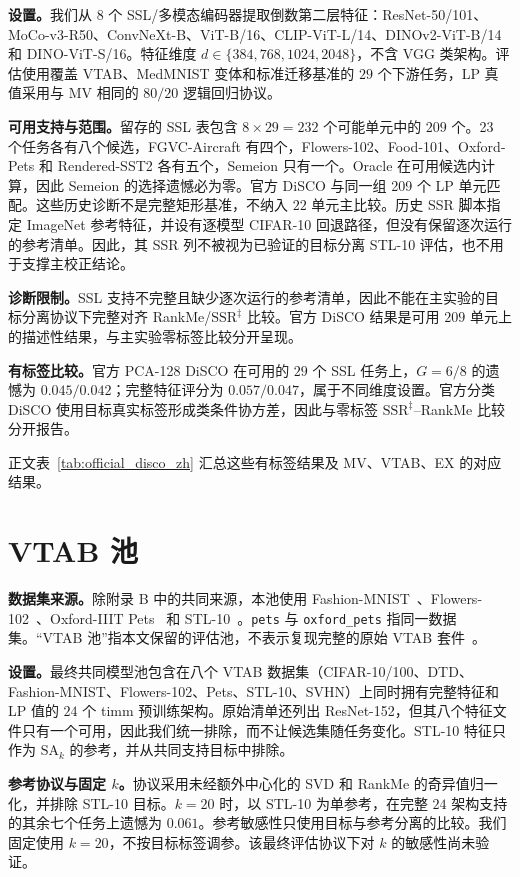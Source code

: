 \documentclass{article}
\newcommand{\SAk}{\ensuremath{\mathrm{SA}_k}\xspace}
\newcommand{\SSRdag}{\ensuremath{\mathrm{SSR}^{\ddagger}}\xspace}
\begin{document}
\textbf{设置。}我们从 $8$ 个 SSL/多模态编码器提取倒数第二层特征：ResNet-50/101、MoCo-v3-R50、ConvNeXt-B、ViT-B/16、CLIP-ViT-L/14、DINOv2-ViT-B/14 和 DINO-ViT-S/16。特征维度 $d\in\{384,768,1024,2048\}$，不含 VGG 类架构。评估使用覆盖 VTAB、MedMNIST 变体和标准迁移基准的 $29$ 个下游任务，LP 真值采用与 MV 相同的 $80/20$ 逻辑回归协议。

\textbf{可用支持与范围。}留存的 SSL 表包含 $8\times29=232$ 个可能单元中的 $209$ 个。23 个任务各有八个候选，FGVC-Aircraft 有四个，Flowers-102、Food-101、Oxford-Pets 和 Rendered-SST2 各有五个，Semeion 只有一个。Oracle 在可用候选内计算，因此 Semeion 的选择遗憾必为零。官方 DiSCO 与同一组 209 个 LP 单元匹配。这些历史诊断不是完整矩形基准，不纳入 $22$ 单元主比较。历史 SSR 脚本指定 ImageNet 参考特征，并设有逐模型 CIFAR-10 回退路径，但没有保留逐次运行的参考清单。因此，其 SSR 列不被视为已验证的目标分离 STL-10 评估，也不用于支撑主校正结论。

\textbf{诊断限制。}SSL 支持不完整且缺少逐次运行的参考清单，因此不能在主实验的目标分离协议下完整对齐 RankMe/\SSRdag 比较。官方 DiSCO 结果是可用 $209$ 单元上的描述性结果，与主实验零标签比较分开呈现。

\textbf{有标签比较。}官方 PCA-128 DiSCO 在可用的 $29$ 个 SSL 任务上，$G=6/8$ 的遗憾为 $0.045/0.042$；完整特征评分为 $0.057/0.047$，属于不同维度设置。官方分类 DiSCO 使用目标真实标签形成类条件协方差，因此与零标签 \SSRdag--RankMe 比较分开报告。

正文表~\ref{tab:official_disco_zh} 汇总这些有标签结果及 MV、VTAB、EX 的对应结果。

\section{VTAB 池}
\textbf{数据集来源。}除附录 B 中的共同来源，本池使用 Fashion-MNIST~\citep{xiao2017fashion}、Flowers-102~\citep{nilsback2008flowers}、Oxford-IIIT Pets~\citep{parkhi2012pets} 和 STL-10~\citep{coates2011stl10}。\texttt{pets} 与 \texttt{oxford\_pets} 指同一数据集。“VTAB 池”指本文保留的评估池，不表示复现完整的原始 VTAB 套件~\citep{zhai2019large}。

\textbf{设置。}最终共同模型池包含在八个 VTAB 数据集（CIFAR-10/100、DTD、Fashion-MNIST、Flowers-102、Pets、STL-10、SVHN）上同时拥有完整特征和 LP 值的 $24$ 个 timm 预训练架构。原始清单还列出 ResNet-152，但其八个特征文件只有一个可用，因此我们统一排除，而不让候选集随任务变化。STL-10 特征只作为 $\SAk$ 的参考，并从共同支持目标中排除。

\textbf{参考协议与固定 $k$。}协议采用未经额外中心化的 SVD 和 RankMe 的奇异值归一化，并排除 STL-10 目标。$k=20$ 时，以 STL-10 为单参考，在完整 $24$ 架构支持的其余七个任务上遗憾为 $0.061$。参考敏感性只使用目标与参考分离的比较。我们固定使用 $k=20$，不按目标标签调参。该最终评估协议下对 $k$ 的敏感性尚未验证。
\end{document}
